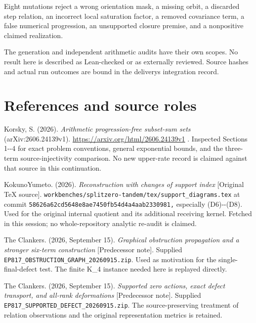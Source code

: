 Eight mutations reject a wrong orientation mask, a missing orbit, a discarded step relation, an incorrect local saturation factor, a removed covariance term, a false numerical progression, an unsupported closure premise, and a nonpositive claimed realization.

The generation and independent arithmetic audits have their own scopes. No result here is described as Lean-checked or as externally reviewed. Source hashes and actual run outcomes are bound in the delivery\textquotesingle s integration record.

\section{References and source roles}\label{n16-references-and-source-roles}

Korsky, S. (2026). \emph{Arithmetic progression-free subset-sum sets} (arXiv:2606.24139v1). \url{https://arxiv.org/html/2606.24139v1} . Inspected Sections 1-\/-4 for exact problem conventions, general exponential bounds, and the three-term source-injectivity comparison. No new upper-rate record is claimed against that source in this continuation.

KokunoYumeto. (2026). \emph{Reconstruction with changes of support index} {[}Original TeX source{]}. \nolinkurl{workbenches/splitzero-tandem/tex/support_diagrams.tex} at commit \nolinkurl{58626a62cd5648e8ae7450fb54d4a4aab2330981,} especially (D6)-\/-(D8). Used for the original internal quotient and its additional receiving kernel. Fetched in this session; no whole-repository analytic re-audit is claimed.

The Clankers. (2026, September 15). \emph{Graphical obstruction propagation and a stronger six-term construction} {[}Predecessor note{]}. Supplied \nolinkurl{EP817_OBSTRUCTION_GRAPH_20260915.zip}. Used as motivation for the single-final-defect test. The finite K\_4 instance needed here is replayed directly.

The Clankers. (2026, September 15). \emph{Supported zero actions, exact defect transport, and all-rank deformations} {[}Predecessor note{]}. Supplied \nolinkurl{EP817_SUPPORTED_DEFECT_20260915.zip}. The source-preserving treatment of relation observations and the original representation metrics is retained.
